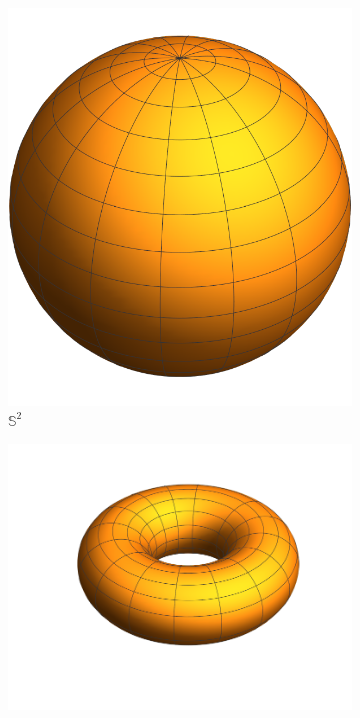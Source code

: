 \begin{figure}
\centering
\begin{subfigure}{0.25\textwidth}
    \centering
    \includegraphics[width=\textwidth]{picture/week4/sphere.pdf}
    \caption{\(\mathbb{S}^2\)}
\end{subfigure}
\begin{subfigure}{0.35\textwidth}
    \centering
    \includegraphics[width=\textwidth]{picture/week4/torus.pdf}

\end{subfigure}
\end{figure}
